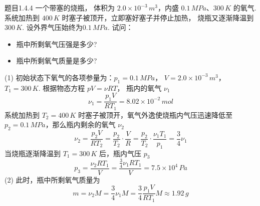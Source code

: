 \begin{question}{题目1.4.4}
    一个带塞的烧瓶， 体积为 $2.0 \times 10^{-3}\,\si{m^3}$，内盛 $0.1\,\si{MPa}$、$300\,\si{K}$ 的氧气. 系统加热到 $400\,\si{K}$ 时塞子被顶开，立即塞好塞子并停止加热， 烧瓶又逐渐降温到$300\,\si{K}$. 设外界气压始终为$0.1\,\si{MPa}$. 试问：
    \begin{itemize}
        \item[(1)] 瓶中所剩氧气压强是多少?
        \item[(2)] 瓶中所剩氧气质量是多少?
    \end{itemize}
\end{question}
\begin{solution}
    (1) 初始状态下氧气的各项参量为：$p_1 = 0.1 \,\si{MPa}$， $V = 2.0 \times 10^{-3} \,\si{m^3}$，$T_1 = 300 \,\si{K}$. 根据物态方程 $pV = \nu RT$， 瓶内的氧气 $\nu_1$
    $$
        \nu_1 = \frac{p_1V}{RT_1} = 8.02 \times 10^{-2} \,\si{mol}
    $$
    系统加热到 $T_2 = 400 \,\si{K}$ 时塞子被顶开，氧气外逸使烧瓶内气压迅速降低至 $p_2 = 0.1 \,\si{MPa}$，那么瓶内剩余的氧气 $\nu_2$
    $$
        \nu_2 = \frac{p_2V}{RT_2}
        = \frac{p_2}{T_2} \cdot \frac{V}{R}
        = \frac{p_2}{T_2} \cdot \frac{\nu_1T_1}{p_1}
        = \frac{3}{4} \nu_1
    $$
    当烧瓶逐渐降温到 $T_1 = 300 \,\si{K}$ 后，瓶内气压 $p_3$
    $$
        p_3 = \frac{\nu_2RT_1}{V}
        = \frac{\frac{3}{4}\nu_1RT_1}{V}
        = 7.5 \times 10^4 \,\si{Pa}
    $$
    (2) 此时，瓶中所剩氧气质量为
    $$
        m = \nu_2 M
        = \frac{3}{4} \nu_1 M
        = \frac{3}{4} \frac{p_1V}{RT_1} M
        \approx 1.92 \,\si{g}
    $$
\end{solution}

